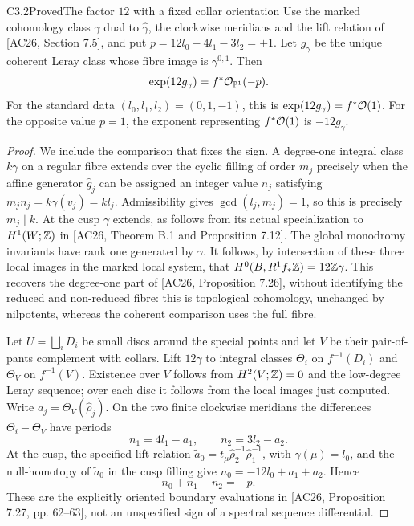\begin{claim}{C3.2}{Proved}{The factor $12$ with a fixed collar orientation}
Use the marked cohomology class $\gamma$ dual to
$\hat\gamma$, the clockwise meridians and the lift relation of
[AC26, Section 7.5], and put
$p=12l_0-4l_1-3l_2=\pm1$.  Let $g_\gamma$ be the unique coherent
Leray class whose fibre image is $\gamma^{0,1}$.  Then
\begin{equation}\label{eq:C-factor12}
\exp(12g_\gamma)=f^*\mathcal O_{\mathbb P^1}(-p).
\end{equation}
For the standard data $(l_0,l_1,l_2)=(0,1,-1)$, this is
$\exp(12g_\gamma)=f^*\mathcal O(1)$.  For the opposite value $p=1$,
the exponent representing $f^*\mathcal O(1)$ is $-12g_\gamma$.
\end{claim}
\begin{proof}
We include the comparison that fixes the sign.  A degree-one integral
class $k\gamma$ on a regular fibre extends over the cyclic filling of
order $m_j$ precisely when the affine generator $\hat g_j$ can be
assigned an integer value $n_j$ satisfying
$m_j n_j=k\gamma(v_j)=kl_j$.  Admissibility gives
$\gcd(l_j,m_j)=1$, so this is precisely $m_j\mid k$.
At the cusp $\gamma$ extends, as follows from its actual specialization
to $H^1(W;\mathbb Z)$ in [AC26, Theorem B.1 and Proposition 7.12].
The global monodromy invariants have rank one generated by $\gamma$.
It follows, by intersection of these three local images in the marked
local system, that
$H^0(B,R^1f_*\mathbb Z)=12\mathbb Z\gamma$.  This recovers the degree-one
part of [AC26, Proposition 7.26], without identifying the reduced and
non-reduced fibre: this is topological cohomology, unchanged by
nilpotents, whereas the coherent comparison uses the full fibre.

Let $U=\bigsqcup_iD_i$ be small discs around the special points and
let $V$ be their pair-of-pants complement with collars.  Lift
$12\gamma$ to integral classes $\Theta_i$ on $f^{-1}(D_i)$ and
$\Theta_V$ on $f^{-1}(V)$.  Existence over $V$ follows from
$H^2(V;\mathbb Z)=0$ and the low-degree Leray sequence; over each disc it
follows from the local images just computed.  Write
$a_j=\Theta_V(\hat\rho_j)$.  On the two finite clockwise meridians
the differences $\Theta_i-\Theta_V$ have periods
\[
n_1=4l_1-a_1,\qquad n_2=3l_2-a_2.
\]
At the cusp, the specified lift relation
$\widetilde a_0=t_\mu\hat\rho_2^{-1}\hat\rho_1^{-1}$,
with $\gamma(\mu)=l_0$, and the null-homotopy of
$\widetilde a_0$ in the cusp filling give
$n_0=-12l_0+a_1+a_2$.  Hence
\begin{equation}\label{eq:C-collar-sum}
n_0+n_1+n_2=-p.
\end{equation}
These are the explicitly oriented boundary evaluations in [AC26,
Proposition 7.27, pp. 62--63], not an unspecified sign of a spectral
sequence differential.


\end{proof}
